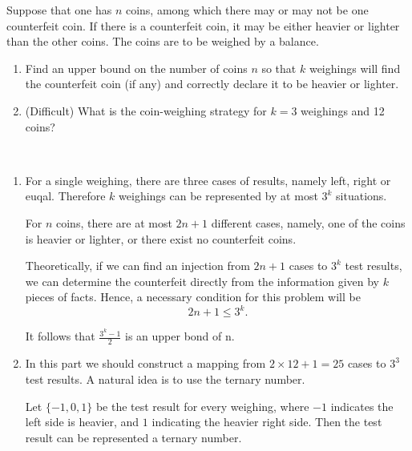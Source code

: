 \begin{exercise} {Suppose that one has $n$ coins, among which there may or may not be one counterfeit coin. If there is a counterfeit coin, it may be either heavier or lighter than the other coins. The coins are to be weighed by a balance.
\begin{enumerate}
\item Find an upper bound on the number of coins $n$ so that $k$ weighings will find the counterfeit coin (if any) and correctly declare it to be heavier or lighter.
\item (Difficult) What is the coin-weighing strategy for $k = 3$ weighings and 12 coins?
\end{enumerate}
}
\begin{solution}
    \par{~}
    \begin{enumerate}
    \item For a single weighing, there are three cases of results, namely left, right or euqal. Therefore $k$ weighings can be represented by at most $3^k$ situations.
    
    For $n$ coins, there are at most $2n+1$ different cases, namely, one of the coins is heavier or lighter, or there exist no counterfeit coins.

    Theoretically, if we can find an injection from $2n+1$ cases to $3^k$ test results, we can determine the counterfeit directly from the information given by $k$ pieces of facts. Hence, a necessary condition for this problem will be $$2n+1 \leq 3^k.$$

    It follows that $\frac{3^k-1}{2}$ is an upper bond of n.

    \item In this part we should construct a mapping from $2\times12+1=25$ cases to $3^3$ test results. A natural idea is to use the ternary number.
    
    Let $\{-1,0,1\}$ be the test result for every weighing, where $-1$ indicates the left side is heavier, and $1$ indicating the heavier right side. Then the test result can be represented a ternary number.


\end{enumerate}
\end{solution}
\end{exercise}
